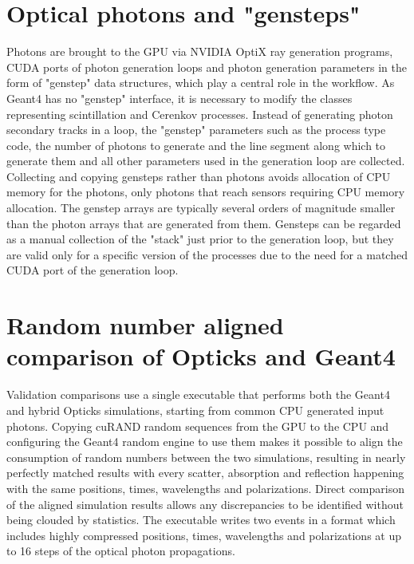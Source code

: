 \documentclass{webofc}
\begin{document}
\section{Optical photons and "gensteps"}%
%
Photons are brought to the GPU via NVIDIA OptiX ray generation programs, 
CUDA ports of photon generation loops and photon generation parameters 
in the form of "genstep" data structures, which play a central role in the workflow.
%
As Geant4 has no "genstep" interface, it is necessary to modify the classes
representing scintillation and Cerenkov processes. Instead of generating photon
secondary tracks in a loop, the "genstep" parameters such as   
the process type code, the number of photons to generate and the line segment along which to generate
them and all other parameters used in the generation loop are collected. 
Collecting and copying gensteps rather than photons avoids
allocation of CPU memory for the photons, only photons that reach sensors
requiring CPU memory allocation. 
The genstep arrays are typically several orders of magnitude smaller than the photon arrays 
that are generated from them.   
%
Gensteps can be regarded as a manual collection of the "stack" just 
prior to the generation loop, but they are valid only for a specific version of the processes 
due to the need for a matched CUDA port of the generation loop.  
%
%

\section{Random number aligned comparison of Opticks and Geant4}
\label{validation}
%
Validation comparisons use a single executable that performs both
the Geant4 and hybrid Opticks simulations, starting from common CPU generated input photons. 
Copying cuRAND random sequences from the GPU to the CPU and configuring the Geant4 random engine to use them makes it possible to align the 
consumption of random numbers between the two simulations, resulting in nearly perfectly matched results with every scatter, 
absorption and reflection happening with the same positions, times, wavelengths and polarizations.
Direct comparison of the aligned simulation results allows any discrepancies to be identified without
being clouded by statistics.
The executable writes two events in a format which includes highly compressed positions, times, wavelengths 
and polarizations at up to 16 steps of the optical photon propagations.
\end{document}
